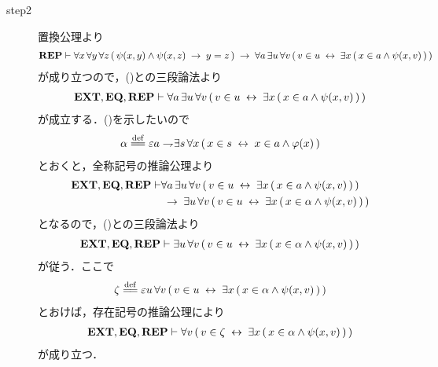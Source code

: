 \begin{sketch}
\begin{description}
			\item[step2]
				置換公理より
				\begin{align}
					\mbox{{\bf REP}} \vdash \forall x\, \forall y\, \forall z\, 
					(\, \psi(x,y) \wedge \psi(x,z)
					\hspace{0.25em}\rightarrow\hspace{0.25em} y = z\, )
					\hspace{0.25em}\rightarrow\hspace{0.25em} \forall a\, \exists u\, \forall v\,
					(\, v \in u \hspace{0.25em}\leftrightarrow\hspace{0.25em} \exists x\, (\, x \in a \wedge 
					\psi(x,v)\, )\, )
				\end{align}
				が成り立つので，()との三段論法より
				\begin{align}
					\mbox{{\bf EXT}},\mbox{{\bf EQ}},\mbox{{\bf REP}} \vdash \forall a\, \exists u\, \forall v\,
					(\, v \in u \hspace{0.25em}\leftrightarrow\hspace{0.25em} \exists x\, (\, x \in a \wedge 
					\psi(x,v)\, )\, )
					\label{fom:thm_axiom_of_separation_2}
				\end{align}
				が成立する．()を示したいので
				\begin{align}
					\alpha \defeq \varepsilon a \negation \exists s\, \forall x\,
					(\, x \in s \lrarrow x \in a \wedge \varphi(x)\, )
				\end{align}
				とおくと，全称記号の推論公理より
				\begin{align}
					\mbox{{\bf EXT}},\mbox{{\bf EQ}},\mbox{{\bf REP}} \vdash &\forall a\, \exists u\, \forall v\,
					(\, v \in u \hspace{0.25em}\leftrightarrow\hspace{0.25em} \exists x\, (\, x \in a \wedge 
					\psi(x,v)\, )\, ) \\
					&\hspace{0.25em}\rightarrow\hspace{0.25em} \exists u\, \forall v\,
					(\, v \in u \hspace{0.25em}\leftrightarrow\hspace{0.25em} \exists x\, (\, x \in \alpha \wedge 
					\psi(x,v)\, )\, )
				\end{align}
				となるので，()との三段論法より
				\begin{align}
					\mbox{{\bf EXT}},\mbox{{\bf EQ}},\mbox{{\bf REP}} \vdash \exists u\, \forall v\,
					(\, v \in u \hspace{0.25em}\leftrightarrow\hspace{0.25em} \exists x\, (\, x \in \alpha \wedge 
					\psi(x,v)\, )\, )
					\label{fom:thm_axiom_of_separation_3}
				\end{align}
				が従う．ここで
				\begin{align}
					\zeta \defeq \varepsilon u\, \forall v\,
					(\, v \in u \lrarrow \exists x\, (\, x \in \alpha \wedge 
					\psi(x,v)\, )\, )
				\end{align}
				とおけば，存在記号の推論公理により
				\begin{align}
					\mbox{{\bf EXT}},\mbox{{\bf EQ}},\mbox{{\bf REP}} \vdash \forall v\,
					(\, v \in \zeta \hspace{0.25em}\leftrightarrow\hspace{0.25em} \exists x\, (\, x \in \alpha \wedge 
					\psi(x,v)\, )\, )
					\label{fom:thm_axiom_of_separation_4}
				\end{align}
				が成り立つ．
			

\end{description}
\end{sketch}
